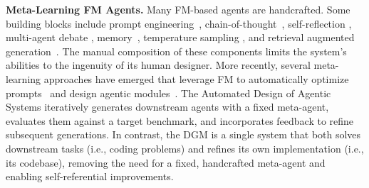 \documentclass{article}
\begin{document}
\textbf{Meta-Learning FM Agents.}
Many FM-based agents are handcrafted. Some building blocks include prompt engineering~\citep{chen2023unleashing, schulhoff2024prompt}, chain-of-thought~\citep{wei2022chain, yao2023react, hu2023ThoughtCloning, guo2025deepseek, lightman2023let, muennighoff2025s1, zelikman2024quiet}, self-reflection \citep{shinn2023reflexion, yao2023react, madaan2303self}, multi-agent debate \citep{liang2023encouraging, khan2024debating}, memory~\citep{liu2023think, zhong2024memorybank, modarressi2023ret}, temperature sampling \citep{zhu2024hot}, and retrieval augmented generation~\citep{lewis2020retrieval}. The manual composition of these components limits the system's abilities to the ingenuity of its human designer. More recently, several meta-learning approaches have emerged that leverage FM to automatically optimize prompts~\citep{fernandopromptbreeder, meta2022human, khattab2023dspy,cheng2025trace,yuksekgonul2024textgrad,yuan2024evoagent} and design agentic modules~\citep{zhang2024aflow, zhou2024symbolic, yin2024g, zhugegptswarm, rosser2025agentbreeder, zhang2025multi, ye2025mas, gao2025flowreasoner, nie2025weak, su2025debflow, zhang2025gnns,niu2025flow}. The Automated Design of Agentic Systems \citep[ADAS,][]{hu2025automated} iteratively generates downstream agents with a fixed meta-agent, evaluates them against a target benchmark, and incorporates feedback to refine subsequent generations. In contrast, the DGM is a single system that both solves downstream tasks (i.e., coding problems) and refines its own implementation (i.e., its codebase), removing the need for a fixed, handcrafted meta-agent and enabling self-referential improvements.
\end{document}
